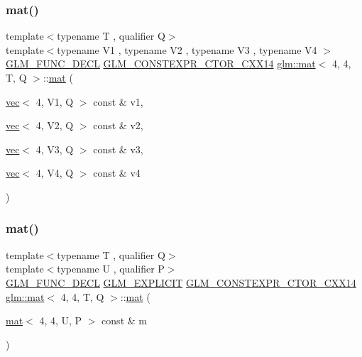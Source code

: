 \subsubsection{\texorpdfstring{mat()}{mat()}\hspace{0.1cm}{\footnotesize\ttfamily [8/21]}}
{\footnotesize\ttfamily template$<$typename T , qualifier Q$>$ \\
template$<$typename V1 , typename V2 , typename V3 , typename V4 $>$ \\
\hyperlink{setup_8hpp_ab2d052de21a70539923e9bcbf6e83a51}{G\+L\+M\+\_\+\+F\+U\+N\+C\+\_\+\+D\+E\+CL} \hyperlink{setup_8hpp_a0900f9145e68bf6061b6f5e7be3fa751}{G\+L\+M\+\_\+\+C\+O\+N\+S\+T\+E\+X\+P\+R\+\_\+\+C\+T\+O\+R\+\_\+\+C\+X\+X14} \hyperlink{structglm_1_1mat}{glm\+::mat}$<$ 4, 4, T, Q $>$\+::\hyperlink{structglm_1_1mat}{mat} (\begin{DoxyParamCaption}\item[{\hyperlink{structglm_1_1vec}{vec}$<$ 4, V1, Q $>$ const \&}]{v1,  }\item[{\hyperlink{structglm_1_1vec}{vec}$<$ 4, V2, Q $>$ const \&}]{v2,  }\item[{\hyperlink{structglm_1_1vec}{vec}$<$ 4, V3, Q $>$ const \&}]{v3,  }\item[{\hyperlink{structglm_1_1vec}{vec}$<$ 4, V4, Q $>$ const \&}]{v4 }\end{DoxyParamCaption})}

\mbox{\label{structglm_1_1mat_3_014_00_014_00_01_t_00_01_q_01_4_a72a3e030050c4da5ee1d208726898e70}} 
\subsubsection{\texorpdfstring{mat()}{mat()}\hspace{0.1cm}{\footnotesize\ttfamily [9/21]}}
{\footnotesize\ttfamily template$<$typename T , qualifier Q$>$ \\
template$<$typename U , qualifier P$>$ \\
\hyperlink{setup_8hpp_ab2d052de21a70539923e9bcbf6e83a51}{G\+L\+M\+\_\+\+F\+U\+N\+C\+\_\+\+D\+E\+CL} \hyperlink{setup_8hpp_a6c74f5a5e7b134ab69023ff9a30d4d5d}{G\+L\+M\+\_\+\+E\+X\+P\+L\+I\+C\+IT} \hyperlink{setup_8hpp_a0900f9145e68bf6061b6f5e7be3fa751}{G\+L\+M\+\_\+\+C\+O\+N\+S\+T\+E\+X\+P\+R\+\_\+\+C\+T\+O\+R\+\_\+\+C\+X\+X14} \hyperlink{structglm_1_1mat}{glm\+::mat}$<$ 4, 4, T, Q $>$\+::\hyperlink{structglm_1_1mat}{mat} (\begin{DoxyParamCaption}\item[{\hyperlink{structglm_1_1mat}{mat}$<$ 4, 4, U, P $>$ const \&}]{m }\end{DoxyParamCaption})}

